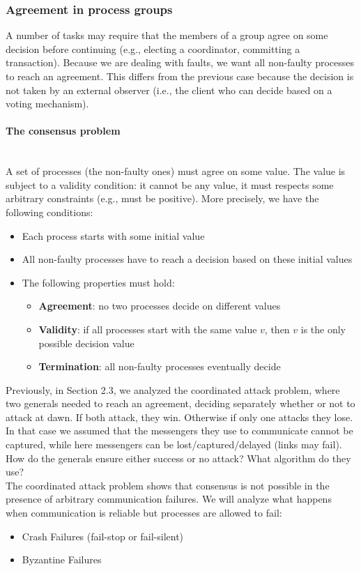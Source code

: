 \documentclass[10pt,a4paper]{article}
\newcommand{\myparagraph}[1]{\paragraph{#1}\mbox{}\\[0.05in]}
\begin{document}
\subsubsection{Agreement in process groups}
A number of tasks may require that the members of a group agree on some decision before continuing (e.g., electing a coordinator, committing a transaction). Because we are dealing with faults, we want all non-faulty processes to reach an agreement. This differs from the previous case because the decision is not taken by an external observer (i.e., the client who can decide based on a voting mechanism).
\myparagraph{The consensus problem}
A set of processes (the non-faulty ones) must agree on some value. The value is subject to a validity condition: it cannot be any value, it must respects some arbitrary constraints (e.g., must be positive). More precisely, we have the following conditions:
\begin{itemize}
	\item Each process starts with some initial value
	\item All non-faulty processes have to reach a decision based on these initial values
	\item The following properties must hold:
	\begin{itemize}
		\item \textbf{Agreement}: no two processes decide on different values
		\item \textbf{Validity}: if all processes start with the same value $v$, then $v$ is the only possible decision value
		\item \textbf{Termination}: all non-faulty processes eventually decide
	\end{itemize}
\end{itemize}
Previously, in Section 2.3, we analyzed the coordinated attack problem, where two generals needed to reach an agreement, deciding separately whether or not to attack at dawn. If both attack, they win. Otherwise if only one attacks they lose. In that case we assumed that the messengers they use to communicate cannot be captured, while here messengers can be lost/captured/delayed (links may fail). How do the generals ensure either success or no attack? What algorithm do they use? \\
The coordinated attack problem shows that consensus is not possible in the presence of arbitrary communication failures. We will analyze what happens when communication is reliable but processes are allowed to fail:
\begin{itemize}
	\item Crash Failures (fail-stop or fail-silent)
	\item Byzantine Failures
\end{itemize}
\end{document}
